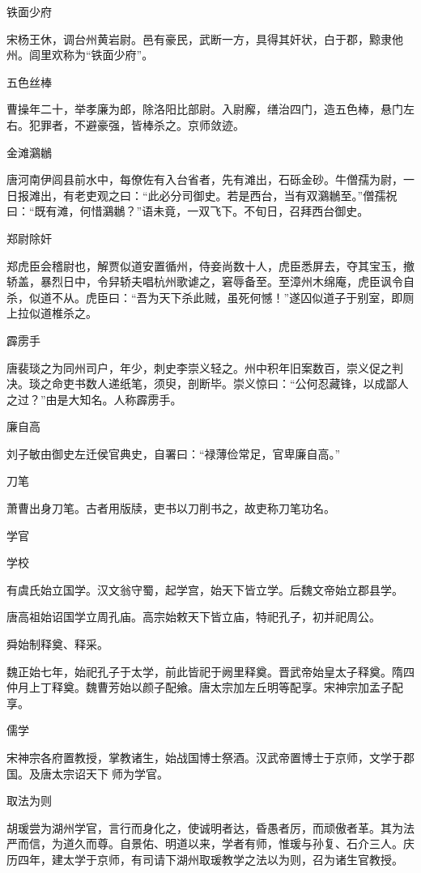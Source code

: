 \documentclass[a4paper,12pt,UTF8,twoside]{ctexbook}
\begin{document}
    铁面少府
    
    宋杨王休，调台州黄岩尉。邑有豪民，武断一方，具得其奸状，白于郡，黥隶他州。闾里欢称为“铁面少府”。
    
    五色丝棒
    
    曹操年二十，举孝廉为郎，除洛阳比部尉。入尉廨，缮治四门，造五色棒，悬门左右。犯罪者，不避豪强，皆棒杀之。京师敛迹。
    
    金滩鸂鶒
    
    唐河南伊闾县前水中，每僚佐有入台省者，先有滩出，石砾金砂。牛僧孺为尉，一日报滩出，有老吏观之曰：“此必分司御史。若是西台，当有双鸂鶒至。”僧孺祝曰：“既有滩，何惜鸂鶒？”语未竟，一双飞下。不旬日，召拜西台御史。
    
    郑尉除奸
    
    郑虎臣会稽尉也，解贾似道安置循州，侍妾尚数十人，虎臣悉屏去，夺其宝玉，撤轿盖，暴烈日中，令舁轿夫唱杭州歌谑之，窘辱备至。至漳州木绵庵，虎臣讽令自杀，似道不从。虎臣曰：“吾为天下杀此贼，虽死何憾！”遂囚似道子于别室，即厕上拉似道椎杀之。
    
    霹雳手
    
    唐裴琰之为同州司户，年少，刺史李崇义轻之。州中积年旧案数百，崇义促之判决。琰之命吏书数人递纸笔，须臾，剖断毕。崇义惊曰：“公何忍藏锋，以成鄙人之过？”由是大知名。人称霹雳手。
    
    廉自高
    
    刘子敏由御史左迁侯官典史，自署曰：“禄薄俭常足，官卑廉自高。”
    
    刀笔
    
    萧曹出身刀笔。古者用版牍，吏书以刀削书之，故吏称刀笔功名。
    
    学官
    
    学校
    
    有虞氏始立国学。汉文翁守蜀，起学宫，始天下皆立学。后魏文帝始立郡县学。
    
    唐高祖始诏国学立周孔庙。高宗始敕天下皆立庙，特祀孔子，初并祀周公。
    
    舜始制释奠、释采。
    
    魏正始七年，始祀孔子于太学，前此皆祀于阙里释奠。晋武帝始皇太子释奠。隋四仲月上丁释奠。魏曹芳始以颜子配飨。唐太宗加左丘明等配享。宋神宗加孟子配享。
    
    儒学
    
    宋神宗各府置教授，掌教诸生，始战国博士祭酒。汉武帝置博士于京师，文学于郡国。及唐太宗诏天下师为学官。
    
    取法为则
    
    胡瑗尝为湖州学官，言行而身化之，使诚明者达，昏愚者厉，而顽傲者革。其为法严而信，为道久而尊。自景佑、明道以来，学者有师，惟瑗与孙复、石介三人。庆历四年，建太学于京师，有司请下湖州取瑗教学之法以为则，召为诸生官教授。
    
\end{document}
